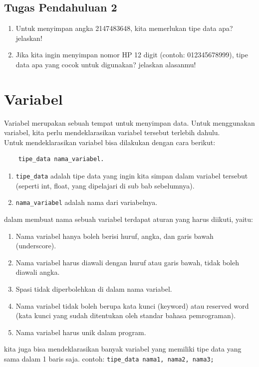 \subsection*{Tugas Pendahuluan 2}
\begin{enumerate}
	\item Untuk menyimpan angka 2147483648, kita memerlukan tipe data apa? jelaskan!
	\item Jika kita ingin menyimpan nomor HP 12 digit (contoh: 012345678999), tipe data apa yang cocok untuk digunakan? jelaskan alasanmu!
\end{enumerate}


\section{Variabel}

Variabel merupakan sebuah tempat untuk menyimpan data.
Untuk menggunakan variabel, kita perlu mendeklarasikan variabel tersebut terlebih dahulu.
\\ Untuk mendeklarasikan variabel bisa dilakukan dengan cara berikut:
\begin{lstlisting}
	tipe_data nama_variabel.
\end{lstlisting}
\begin{enumerate}[label={}, leftmargin=*]
	\item \verb|tipe_data| adalah tipe data yang ingin kita simpan dalam variabel tersebut (seperti int, float, yang dipelajari di sub bab sebelumnya).
	\item \verb|nama_variabel| adalah nama dari variabelnya.
\end{enumerate}
dalam membuat nama sebuah variabel terdapat aturan yang harus diikuti, yaitu:
\begin{enumerate}
	\item Nama variabel hanya boleh berisi huruf, angka, dan garis bawah (underscore).
	\item Nama variabel harus diawali dengan huruf atau garis bawah, tidak boleh diawali angka.
	\item Spasi tidak diperbolehkan di dalam nama variabel.
	\item Nama variabel tidak boleh berupa kata kunci (keyword) atau reserved word (kata kunci yang sudah ditentukan oleh standar bahasa pemrograman).
	\item Nama variabel harus unik dalam program.
\end{enumerate}
kita juga bisa mendeklarasikan banyak variabel yang memiliki tipe data yang sama dalam 1 baris saja.
contoh: \verb|tipe_data nama1, nama2, nama3;|


